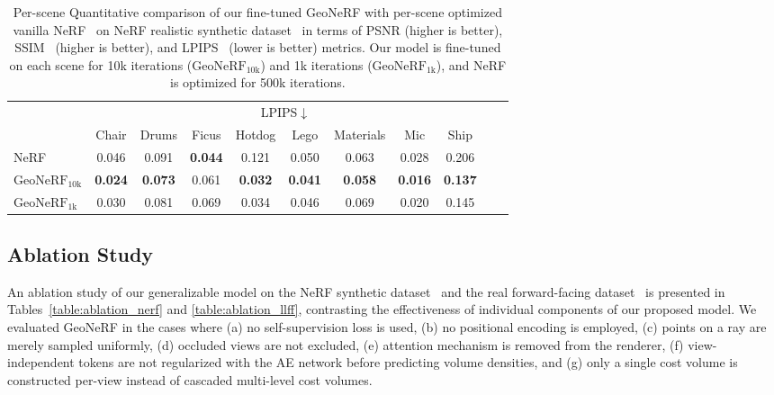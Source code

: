 \begin{table}[!t]
    \begin{center}
        \begin{threeparttable}
            \begin{tabular}{l|cccccccccc}
            & \multicolumn{8}{c}{LPIPS$\downarrow$} \\
            &  Chair & Drums & Ficus & Hotdog & Lego & Materials & Mic & Ship \\
            \hline
            NeRF & 0.046 & 0.091 & \textbf{0.044} & 0.121 & 0.050 & 0.063 & 0.028 & 0.206 \\
            $\text{GeoNeRF}_{\text{10k}}$ & \textbf{0.024} & \textbf{0.073} & 0.061 & \textbf{0.032} & \textbf{0.041} & \textbf{0.058} & \textbf{0.016} & \textbf{0.137} \\
            $\text{GeoNeRF}_{\text{1k}}$ & 0.030 & 0.081 & 0.069 & 0.034 & 0.046 & 0.069 & 0.020 & 0.145 \\            
            \hline
            \end{tabular}
        \end{threeparttable}
    \end{center}
    \vspace{3.0ex}
    \caption{Per-scene Quantitative comparison of our fine-tuned GeoNeRF with per-scene optimized vanilla NeRF~\citep{mildenhall2020nerf} on NeRF realistic synthetic dataset~\citep{mildenhall2020nerf} in terms of PSNR (higher is better), SSIM~\citep{wang2004image} (higher is better), and LPIPS~\citep{zhang2018unreasonable} (lower is better) metrics. Our model is fine-tuned on each scene for 10k iterations ($\text{GeoNeRF}_{\text{10k}}$) and 1k iterations ($\text{GeoNeRF}_{\text{1k}}$), and NeRF is optimized for 500k iterations.}
    \label{table:per_scene_ft_nerf}
\end{table}

\subsection{Ablation Study} \label{sec:c3_ablation}
An ablation study of our generalizable model on the NeRF synthetic dataset~\citep{mildenhall2020nerf} and the real forward-facing dataset~\citep{mildenhall2019llff} is presented in Tables~\ref{table:ablation_nerf} and \ref{table:ablation_llff}, contrasting the effectiveness of individual components of our proposed model. We evaluated GeoNeRF in the cases where (a) no self-supervision loss is used, (b) no positional encoding is employed, (c) points on a ray are merely sampled uniformly, (d) occluded views are not excluded, (e) attention mechanism is removed from the renderer, (f) view-independent tokens are not regularized with the AE network before predicting volume densities, and (g) only a single cost volume is constructed per-view instead of cascaded multi-level cost volumes.

